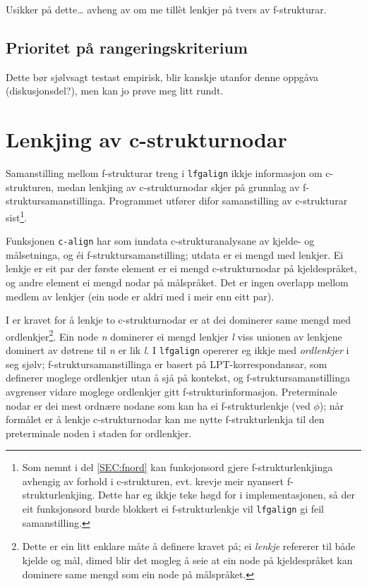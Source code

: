 \documentclass[11pt,a4paper,oneside,draft]{book}
\begin{document}
    Usikker på dette\ldots{} avheng av om me tillèt lenkjer på tvers av
    f-strukturar.
\subsection{Prioritet på rangeringskriterium}
\label{sec-4.2.5}

    Dette bør sjølvsagt testast empirisk, blir kanskje utanfor denne
    oppgåva (diskusjonsdel?), men kan jo prøve meg litt rundt.
\section{Lenkjing av c-strukturnodar}
\label{sec-4.3}

Samanstilling mellom f-strukturar treng i \texttt{lfgalign} ikkje informasjon
om c-strukturen, medan lenkjing av c-strukturnodar skjer på grunnlag
av f-struktursamanstillinga. Programmet utfører difor samanstilling av
c-strukturar sist\footnote{Som nemnt i del \ref{SEC:fnord} kan funksjonsord gjere
       f-strukturlenkjinga avhengig av forhold i c-strukturen,
       evt. krevje meir nyansert f-strukturlenkjing. Dette har eg
       ikkje teke høgd for i implementasjonen, så der eit funksjonsord
       burde blokkert ei f-strukturlenkje vil \texttt{lfgalign} gi feil
       samanstilling. }.

Funksjonen \texttt{c-align} har som inndata c-strukturanalysane av kjelde- og
målsetninga, og éi f-struktursamanstilling; utdata er ei mengd med
lenkjer. Ei lenkje er eit par der første element er ei mengd
c-strukturnodar på kjeldespråket, og andre element ei mengd nodar på
målspråket. Det er ingen overlapp mellom medlem av lenkjer (ein node
er aldri med i meir enn eitt par).

I \citet[s.~77]{dyvik2009lmp} er kravet for å lenkje to
c-strukturnodar er at dei dominerer same mengd med
ordlenkjer\footnote{Dette er ein litt enklare måte å definere kravet på; ei
        \emph{lenkje} refererer til både kjelde og mål, dimed blir det
        mogleg å seie at ein node på kjeldespråket kan dominere same
        mengd som ein node på målspråket. }. Ein node \emph{n} dominerer ei mengd lenkjer \emph{l} viss
unionen av lenkjene dominert av døtrene til \emph{n} er lik \emph{l}. I
\texttt{lfgalign} opererer eg ikkje med \emph{ordlenkjer} i seg sjølv;
f-struktursamanstillinga er basert på LPT-korrespondansar, som
definerer moglege ordlenkjer utan å sjå på kontekst, og
f-struktursamanstillinga avgrenser vidare moglege ordlenkjer gitt
f-strukturinformasjon. Preterminale nodar er dei mest ordnære nodane
som kan ha ei f-strukturlenkje (ved $\phi$); når formålet er å lenkje
c-strukturnodar kan me nytte f-strukturlenkja til den preterminale
noden i staden for ordlenkjer.
\end{document}
